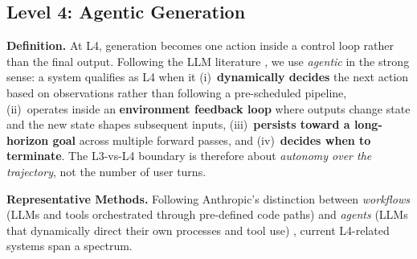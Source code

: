 \subsection{Level 4: Agentic Generation}
\label{subsec:level4}



\textbf{Definition.} At L4, generation becomes one action inside a control loop rather than the final output. Following the LLM literature \citep{anthropic2024agents}, we use \emph{agentic} in the strong sense: a system qualifies as L4 when it (i)~\textbf{dynamically decides} the next action based on observations rather than following a pre-scheduled pipeline, (ii)~operates inside an \textbf{environment feedback loop} where outputs change state and the new state shapes subsequent inputs, (iii)~\textbf{persists toward a long-horizon goal} across multiple forward passes, and (iv)~\textbf{decides when to terminate}. The L3-vs-L4 boundary is therefore about \emph{autonomy over the trajectory}, not the number of user turns.

\textbf{Representative Methods.} Following Anthropic's distinction between \emph{workflows} (LLMs and tools orchestrated through pre-defined code paths) and \emph{agents} (LLMs that dynamically direct their own processes and tool use) \citep{anthropic2024agents}, current L4-related systems span a spectrum.

